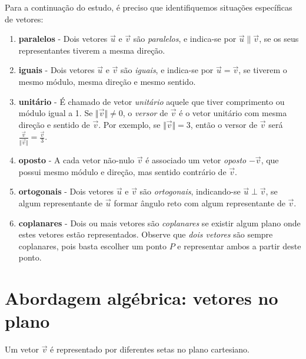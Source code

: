 Para a continuação do estudo, é preciso que identifiquemos situações específicas de vetores:
\begin{enumerate}[(1)]
 \item \textbf{paralelos} - Dois vetores $\vec u$ e $\vec v$ são \textit{paralelos}, e indica-se por $\vec u \parallel \vec v$, se os seus representantes tiverem a mesma direção.
 \item \textbf{iguais} - Dois vetores $\vec u$ e $\vec v$ são \textit{iguais}, e indica-se por $\vec u=\vec v$, se tiverem o mesmo módulo, mesma direção e mesmo sentido.
 \item \textbf{unitário} - É chamado de vetor \textit{unitário} aquele que tiver comprimento ou módulo igual a 1. Se $\Vert \vec v \Vert\neq 0$, o \textit{versor} de $\vec v$ é o vetor unitário com mesma direção e sentido de $\vec v$. Por exemplo, se $\Vert \vec v \Vert =3$, então o versor de $\vec v$ será $\frac{\vec v}{\Vert \vec v \Vert}=\frac{\vec v}{3}$.
 \item \textbf{oposto} - A cada vetor não-nulo $\vec v$ é associado um vetor \textit{oposto} $-\vec v$, que possui mesmo módulo e direção, mas sentido contrário de $\vec v$.
 \item \textbf{ortogonais} - Dois vetores $\vec u$ e $\vec v$ são \textit{ortogonais}, indicando-se $\vec u \perp \vec v$, se algum representante de $\vec u$ formar ângulo reto com algum representante de $\vec v$.
 \item \textbf{coplanares} - Dois ou mais vetores são \textit{coplanares} se existir algum plano onde estes vetores estão representados. Observe que \textit{dois vetores} são sempre coplanares, pois basta escolher um ponto $P$ e representar ambos a partir deste ponto. 
\end{enumerate}

\section{Abordagem algébrica: vetores no plano}

\begin{df}
Um vetor $\vec{v}$ é representado por diferentes setas no plano cartesiano.
\end{df}

